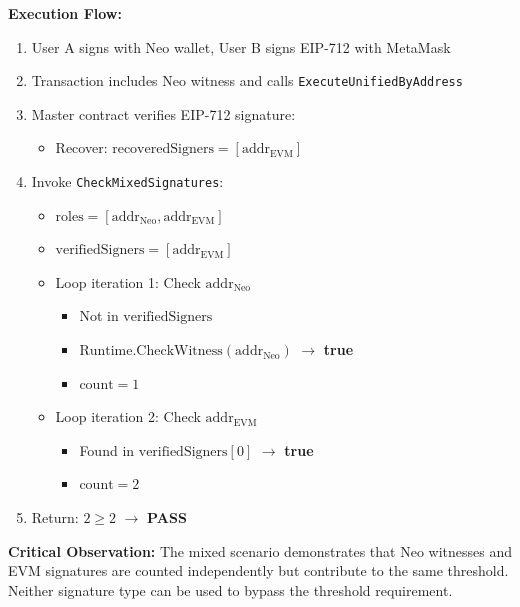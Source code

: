 \documentclass[10pt,twocolumn]{article}
\newcommand{\code}[1]{\texttt{\small #1}}
\begin{document}
{\textbf{Execution Flow:}
\begin{enumerate}[leftmargin=*,topsep=2pt,itemsep=1pt]
\item User A signs with Neo wallet, User B signs EIP-712 with MetaMask
\item Transaction includes Neo witness and calls \code{ExecuteUnifiedByAddress}
\item Master contract verifies EIP-712 signature:
  \begin{itemize}[leftmargin=*,topsep=1pt,itemsep=0pt]
  \item Recover: $\text{recoveredSigners} = [\text{addr}_{\text{EVM}}]$
  \end{itemize}
\item Invoke \code{CheckMixedSignatures}:
  \begin{itemize}[leftmargin=*,topsep=1pt,itemsep=0pt]
  \item $\text{roles} = [\text{addr}_{\text{Neo}}, \text{addr}_{\text{EVM}}]$
  \item $\text{verifiedSigners} = [\text{addr}_{\text{EVM}}]$
  \item Loop iteration 1: Check $\text{addr}_{\text{Neo}}$
    \begin{itemize}[leftmargin=*,topsep=0pt,itemsep=0pt]
    \item Not in $\text{verifiedSigners}$
    \item $\text{Runtime.CheckWitness}(\text{addr}_{\text{Neo}})$ $\rightarrow$ \textbf{true}
    \item $\text{count} = 1$
    \end{itemize}
  \item Loop iteration 2: Check $\text{addr}_{\text{EVM}}$
    \begin{itemize}[leftmargin=*,topsep=0pt,itemsep=0pt]
    \item Found in $\text{verifiedSigners}[0]$ $\rightarrow$ \textbf{true}
    \item $\text{count} = 2$
    \end{itemize}
  \end{itemize}
\item Return: $2 \geq 2$ $\rightarrow$ \textbf{PASS}
\end{enumerate}

\textbf{Critical Observation:} The mixed scenario demonstrates that Neo witnesses and EVM signatures are counted independently but contribute to the same threshold. Neither signature type can be used to bypass the threshold requirement.

}
\end{document}
